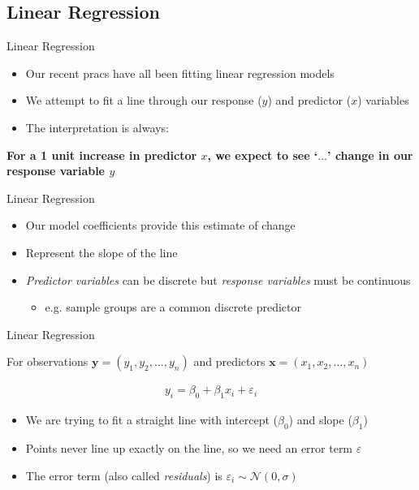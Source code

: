 \documentclass[aspectratio=169,11pt]{beamer}
\begin{document}
\subsection{Linear Regression}

\begin{frame}{Linear Regression}

	\begin{itemize}
		\item Our recent pracs have all been fitting linear regression models
		\item We attempt to fit a line through our response ($y$) and predictor ($x$) variables
		\item The interpretation is always:
	\end{itemize}
	\begin{center}
	\textbf{For a 1 unit increase in predictor $x$, we expect to see `$\ldots$' change in our response variable $y$}
	\end{center}
	
\end{frame}

\begin{frame}{Linear Regression}
	
	\begin{itemize}
		\item Our model coefficients provide this estimate of change
		\item Represent the slope of the line
		\item \textit{Predictor variables} can be discrete but \textit{response variables} must be continuous
		\begin{itemize}
			\item e.g. sample groups are a common discrete predictor
		\end{itemize}
	\end{itemize}
	
\end{frame}

\begin{frame}{Linear Regression}

For observations $\mathbf{y} = (y_1, y_2, \ldots, y_n)$ and predictors $\mathbf{x} = (x_1, x_2, \ldots, x_n)$

	\begin{align*}
	y_{i} = \beta_0 + \beta_1 x_i + \varepsilon_i
	\end{align*}

	\begin{itemize}
		\item We are trying to fit a straight line with intercept ($\beta_0$) and slope ($\beta_1$)
		\item Points never line up exactly on the line, so we need an error term $\varepsilon$
		\item The error term (also called \textit{residuals}) is $\varepsilon_i \sim \mathcal{N} (0, \sigma)$
	\end{itemize}

\end{frame}
\end{document}
